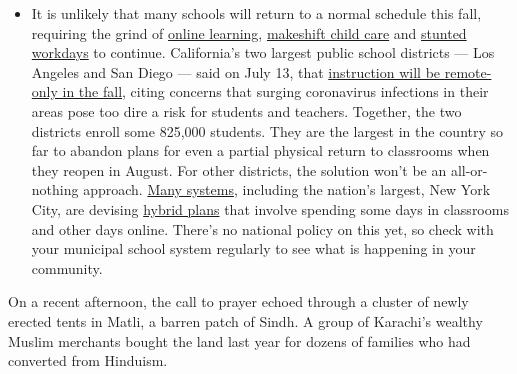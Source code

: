 \begin{itemize}
  \begin{itemize}
  \tightlist
  \item
    It is unlikely that many schools will return to a normal schedule
    this fall, requiring the grind of
    \href{https://www.nytimes3xbfgragh.onion/2020/06/05/us/coronavirus-education-lost-learning.html?action=click\&pgtype=Article\&state=default\&region=MAIN_CONTENT_3\&context=storylines_faq}{online
    learning},
    \href{https://www.nytimes3xbfgragh.onion/2020/05/29/us/coronavirus-child-care-centers.html?action=click\&pgtype=Article\&state=default\&region=MAIN_CONTENT_3\&context=storylines_faq}{makeshift
    child care} and
    \href{https://www.nytimes3xbfgragh.onion/2020/06/03/business/economy/coronavirus-working-women.html?action=click\&pgtype=Article\&state=default\&region=MAIN_CONTENT_3\&context=storylines_faq}{stunted
    workdays} to continue. California's two largest public school
    districts --- Los Angeles and San Diego --- said on July 13, that
    \href{https://www.nytimes3xbfgragh.onion/2020/07/13/us/lausd-san-diego-school-reopening.html?action=click\&pgtype=Article\&state=default\&region=MAIN_CONTENT_3\&context=storylines_faq}{instruction
    will be remote-only in the fall}, citing concerns that surging
    coronavirus infections in their areas pose too dire a risk for
    students and teachers. Together, the two districts enroll some
    825,000 students. They are the largest in the country so far to
    abandon plans for even a partial physical return to classrooms when
    they reopen in August. For other districts, the solution won't be an
    all-or-nothing approach.
    \href{https://bioethics.jhu.edu/research-and-outreach/projects/eschool-initiative/school-policy-tracker/}{Many
    systems}, including the nation's largest, New York City, are
    devising
    \href{https://www.nytimes3xbfgragh.onion/2020/06/26/us/coronavirus-schools-reopen-fall.html?action=click\&pgtype=Article\&state=default\&region=MAIN_CONTENT_3\&context=storylines_faq}{hybrid
    plans} that involve spending some days in classrooms and other days
    online. There's no national policy on this yet, so check with your
    municipal school system regularly to see what is happening in your
    community.
  \end{itemize}
\end{itemize}

On a recent afternoon, the call to prayer echoed through a cluster of
newly erected tents in Matli, a barren patch of Sindh. A group of
Karachi's wealthy Muslim merchants bought the land last year for dozens
of families who had converted from Hinduism.

